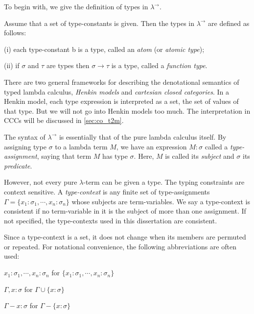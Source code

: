 To begin with, we give the definition of types in $ \lambda ^\to $.
\begin{definition}
\label{definition:types}
Assume that a set of type-constants is given. Then the types in $ \lambda ^\to $ are defined as follows:
\begin{myitemize}
\item[(i)] each type-constant b is a type, called an \emph{atom} (or \emph{atomic type});
\item[(ii)] if $ \sigma $ and $ \tau $ are types then $ \sigma \to \tau $ is a type, called a \emph{function type}.
\end{myitemize}
\end{definition}

There are two general frameworks for describing the denotational semantics of typed lambda calculus, \emph{Henkin models} and \emph{cartesian closed categories}. In a Henkin model, each type expression is interpreted as a set, the set of values of that type. But we will not go into Henkin models too much. The interpretation in CCCs will be discussed in \ref{sec:co_t2m}.

The syntax of $ \lambda ^\to $ is essentially that of the pure lambda calculus itself. By assigning type $ \sigma $ to a lambda term $ M $, we have an expression $ M:\sigma $ called a \emph{type-assignment}, saying that term $ M $ has type $ \sigma $. Here, $ M $ is called its \emph{subject} and $ \sigma $ its \emph{predicate}.

However, not every pure $ \lambda $-term can be given a type. The typing constraints are context sensitive. A \emph{type-context} is any finite set of type-assignments $ \Gamma = \{ x_1 : \sigma _1 , \cdots , x_n : \sigma _n \} $ whose subjects are term-variables. We say a type-context is consistent if no term-variable in it is the subject of more than one assignment. If not specified, the type-contexts used in this dissertation are consistent.

Since a type-context is a set, it does not change when its members are permuted or repeated. For notational convenience, the following abbreviations are often used:
\begin{myitemize}
\item $x_1 : \sigma _1 , \cdots , x_n : \sigma _n $ for $ \{ x_1 : \sigma _1 , \cdots , x_n : \sigma _n \} $
\item $ \Gamma , x : \sigma $ for $ \Gamma \cup \{ x : \sigma \} $
\item $ \Gamma - x : \sigma $ for $ \Gamma - \{ x : \sigma \} $
\end{myitemize}


